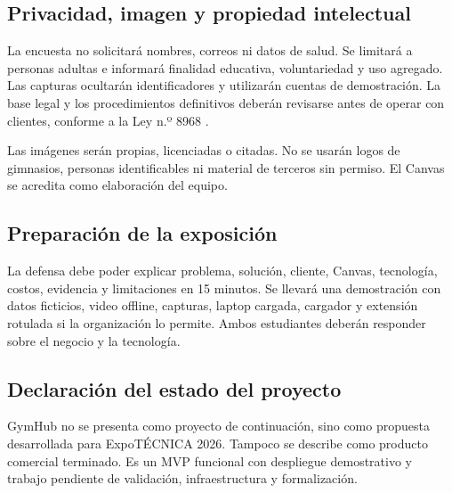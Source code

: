 \subsection{Privacidad, imagen y propiedad intelectual}

La encuesta no solicitará nombres, correos ni datos de salud. Se limitará a
personas adultas e informará finalidad educativa, voluntariedad y uso agregado.
Las capturas ocultarán identificadores y utilizarán cuentas de demostración. La
base legal y los procedimientos definitivos deberán revisarse antes de operar con
clientes, conforme a la Ley n.º 8968 \parencite{ley8968}.

Las imágenes serán propias, licenciadas o citadas. No se usarán logos de gimnasios,
personas identificables ni material de terceros sin permiso. El Canvas se acredita
como elaboración del equipo.

\subsection{Preparación de la exposición}

La defensa debe poder explicar problema, solución, cliente, Canvas, tecnología,
costos, evidencia y limitaciones en 15 minutos. Se llevará una demostración con
datos ficticios, video offline, capturas, laptop cargada, cargador y extensión
rotulada si la organización lo permite. Ambos estudiantes deberán responder sobre
el negocio y la tecnología.

\subsection{Declaración del estado del proyecto}

GymHub no se presenta como proyecto de continuación, sino como propuesta
desarrollada para ExpoTÉCNICA 2026. Tampoco se describe como producto comercial
terminado. Es un MVP funcional con despliegue demostrativo y trabajo pendiente de
validación, infraestructura y formalización.
